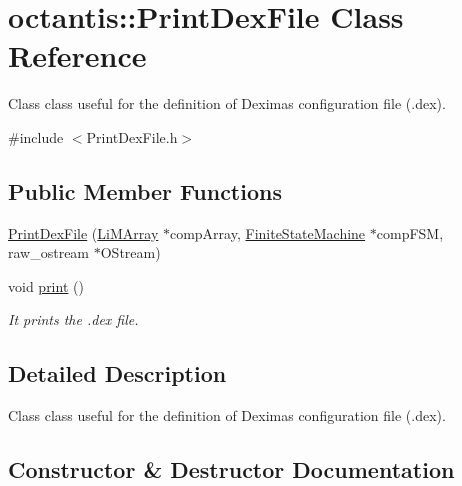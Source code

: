 \hypertarget{classoctantis_1_1PrintDexFile}{}\section{octantis\+:\+:Print\+Dex\+File Class Reference}
\label{classoctantis_1_1PrintDexFile}


Class class useful for the definition of Dexima\textquotesingle{}s configuration file (.dex).  




{\ttfamily \#include $<$Print\+Dex\+File.\+h$>$}

\subsection*{Public Member Functions}
\begin{DoxyCompactItemize}
\item 
\hyperlink{classoctantis_1_1PrintDexFile_a8419b2b9f856dbefc859a563125f203c}{Print\+Dex\+File} (\hyperlink{classoctantis_1_1LiMArray}{Li\+M\+Array} $\ast$comp\+Array, \hyperlink{classoctantis_1_1FiniteStateMachine}{Finite\+State\+Machine} $\ast$comp\+F\+SM, raw\+\_\+ostream $\ast$O\+Stream)
\item 
void \hyperlink{classoctantis_1_1PrintDexFile_a81a7a3c3c35f91aabd83c2902f56dfb1}{print} ()
\begin{DoxyCompactList}\small\item\em It prints the .dex file. \end{DoxyCompactList}\end{DoxyCompactItemize}


\subsection{Detailed Description}
Class class useful for the definition of Dexima\textquotesingle{}s configuration file (.dex). 

\subsection{Constructor \& Destructor Documentation}
\mbox{\label{classoctantis_1_1PrintDexFile_a8419b2b9f856dbefc859a563125f203c}} 
